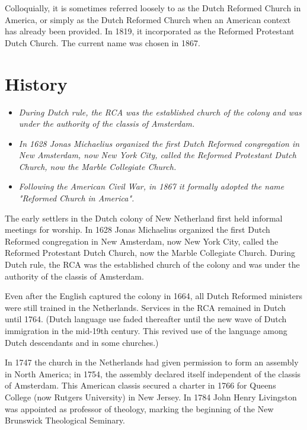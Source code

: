Colloquially, it is sometimes referred loosely to as the Dutch Reformed
Church in America, or simply as the Dutch Reformed Church when an
American context has already been provided. In 1819, it incorporated as
the Reformed Protestant Dutch Church. The current name was chosen in
1867.

\section{History}\label{history}

\begin{itemize}
\item
  \emph{During Dutch rule, the RCA was the established church of the
  colony and was under the authority of the classis of Amsterdam.}
\item
  \emph{In 1628 Jonas Michaelius organized the first Dutch Reformed
  congregation in New Amsterdam, now New York City, called the Reformed
  Protestant Dutch Church, now the Marble Collegiate Church.}
\item
  \emph{Following the American Civil War, in 1867 it formally adopted
  the name "Reformed Church in America".}
\end{itemize}

The early settlers in the Dutch colony of New Netherland first held
informal meetings for worship. In 1628 Jonas Michaelius organized the
first Dutch Reformed congregation in New Amsterdam, now New York City,
called the Reformed Protestant Dutch Church, now the Marble Collegiate
Church. During Dutch rule, the RCA was the established church of the
colony and was under the authority of the classis of Amsterdam.

Even after the English captured the colony in 1664, all Dutch Reformed
ministers were still trained in the Netherlands. Services in the RCA
remained in Dutch until 1764. (Dutch language use faded thereafter until
the new wave of Dutch immigration in the mid-19th century. This revived
use of the language among Dutch descendants and in some churches.)

In 1747 the church in the Netherlands had given permission to form an
assembly in North America; in 1754, the assembly declared itself
independent of the classis of Amsterdam. This American classis secured a
charter in 1766 for Queens College (now Rutgers University) in New
Jersey. In 1784 John Henry Livingston was appointed as professor of
theology, marking the beginning of the New Brunswick Theological
Seminary.

